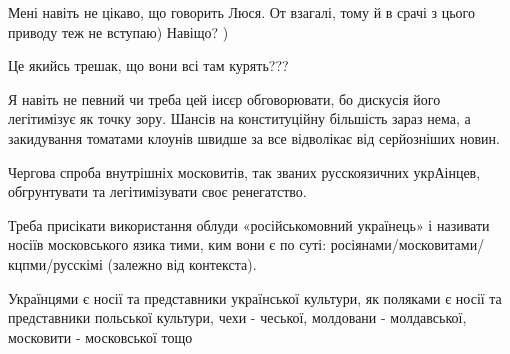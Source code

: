 \begin{itemize}
 
Мені навіть не цікаво, що говорить Люся. От взагалі, тому й в срачі з цього приводу теж не вступаю) Навіщо? )

 
Це якийсь трешак, що вони всі там курять???

 

Я навіть не певний чи треба цей іисєр обговорювати, бо дискусія його
легітимізує як точку зору. Шансів на конституційну більшість зараз нема, а
закидування томатами клоунів швидше за все відволікає від серйозніших новин.

 

Чергова спроба внутрішніх московитів, так званих русскоязичних укрАінцев,
обгрунтувати та легітимізувати своє ренегатство.

Треба присікати використання облуди «російськомовний українець» і називати
носіїв московського язика тими, ким вони є по суті:
росіянами/московитами/кцпми/русскімі (залежно від контекста).

Українцями є носії та представники української культури, як поляками є носії та
представники польської культури, чехи - чеської, молдовани - молдавської,
московити - московської тощо


 

\end{itemize}
